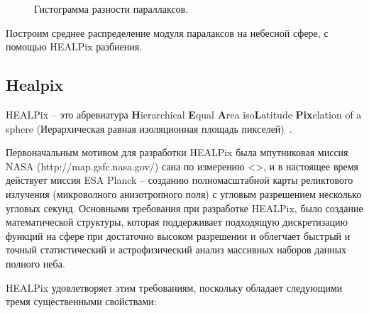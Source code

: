 \documentclass[14pt]{article} %
\begin{document}
\begin{figure}[h!]
\caption{Гистограмма разности параллаксов.}
\label{img:hist_par_deff}
\end{figure}

Построим среднее распределение модуля паралаксов на небесной сфере, с помощью HEALPix разбиения.

\subsection{Healpix}\label{sub:smthhealpix}
HEALPix -- это абревиатура \textbf{H}ierarchical \textbf{E}qual \textbf{A}rea iso\textbf{L}atitude \textbf{Pix}elation of a sphere (Иерархическая равная изоляционная площадь пикселей)~\cite{wiki:healpix}.

Первоначальным мотивом для разработки HEALPix была мпутниковая миссия NASA (http://map.gsfc.nasa.gov/) сана по измерению <>, и в настоящее время действует миссия ESA Planck -- созданию полномасштабной карты реликтового излучения (микроволного анизотропного поля) с угловым разрешением несколько угловых секунд. Основными требования при разработке HEALPix, было создание математической структуры, которая поддерживает подходящую дискретизацию функций на сфере при достаточно высоком разрешении и облегчает быстрый и точный статистический и астрофизический анализ массивных наборов данных полного неба.

HEALPix удовлетворяет этим требованиям, поскольку обладает следующими тремя существенными свойствами:
\end{document}
